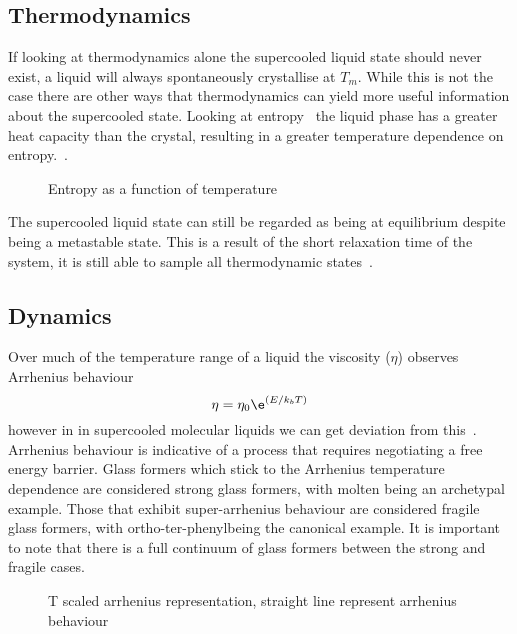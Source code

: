 \subsection{Thermodynamics}

If looking at thermodynamics alone the supercooled liquid state should never exist, a liquid will always spontaneously crystallise at $T_m$. While this is not the case there are other ways that thermodynamics can yield more useful information about the supercooled state. Looking at entropy~ the liquid phase has a greater heat capacity than the crystal, resulting in a greater temperature dependence on entropy.~\cite{debenedetti:01}.

\begin{figure}
    \caption{Entropy as a function of temperature}
    \label{fig:entropy}
\end{figure}

The supercooled liquid state can still be regarded as being at equilibrium despite being a metastable state. This is a result of the short relaxation time of the system, it is still able to sample all thermodynamic states~\cite{cavagna:09}.

\subsection{Dynamics}

Over much of the temperature range of a liquid the viscosity ($\eta$) observes Arrhenius behaviour
\begin{equation}
    \eta = \eta_0 \e^{(E/k_bT)}
\end{equation}
however in in supercooled molecular liquids we can get deviation from this~. Arrhenius behaviour is indicative of a process that requires negotiating a free energy barrier.  Glass formers which stick to the Arrhenius temperature dependence are considered strong glass formers, with molten  being an archetypal example. Those that exhibit super-arrhenius behaviour are considered fragile glass formers, with ortho-ter-phenyl\tocheck being the canonical example. It is important to note that there is a full continuum of glass formers between the strong and fragile cases.

\begin{figure}
    \caption{T scaled arrhenius representation, straight line represent arrhenius behaviour}
    \label{fig:angell}
\end{figure}

